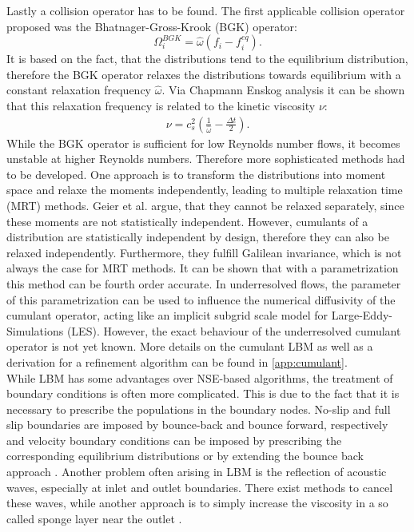 Lastly a collision operator has to be found. The first applicable collision operator proposed was the Bhatnager-Gross-Krook (BGK) operator:
\begin{equation}
	\Omega^{BGK}_i = \hat{\omega}\left(f_i - f_i^{eq} \right). \label{eq:BGK}
\end{equation}
It is based on the fact, that the distributions tend to the equilibrium distribution, therefore the BGK operator relaxes the distributions towards equilibrium with a constant relaxation frequency $\hat{\omega}$. Via Chapmann Enskog analysis it can be shown that this relaxation frequency is related to the kinetic viscosity $\nu$: \cite[p. 98-100, 112]{kruger_lattice_2017}
\begin{align}
	\nu = c_s^2\left(\frac{1}{\hat{\omega}} - \frac{\Delta t }{2} \right). \label{eq:nu}
\end{align}
While the BGK operator is sufficient for low Reynolds number flows, it becomes unstable at higher Reynolds numbers. Therefore more sophisticated methods had to be developed. One approach is to transform the distributions into moment space and relaxe the moments independently, leading to multiple relaxation time (MRT) methods. Geier et al. argue, that they cannot be relaxed separately, since these moments are not statistically independent. However, cumulants of a distribution are statistically independent by design, therefore they can also be relaxed independently. Furthermore, they fulfill Galilean invariance, which is not always the case for MRT methods. It can be shown that with a parametrization this method can be fourth order accurate\cite{geier_fourth_2018}. In underresolved flows, the parameter of this parametrization can be used to influence the numerical diffusivity of the cumulant operator, acting like an implicit subgrid scale model for Large-Eddy-Simulations (LES)\cite{asmuth_actuator_2020}. However, the exact behaviour of the underresolved cumulant operator is not yet known. More details on the cumulant LBM as well as a derivation for a refinement algorithm can be found in \autoref{app:cumulant}. \\
While LBM has some advantages over NSE-based algorithms, the treatment of boundary conditions is often more complicated. This is due to the fact that it is necessary to prescribe the populations in the boundary nodes. No-slip and full slip boundaries are imposed by bounce-back and bounce forward, respectively and velocity boundary conditions can be imposed by prescribing the corresponding equilibrium distributions or by extending the bounce back approach \cite[p. 175 - 189, 199 - 207]{kruger_lattice_2017}. Another problem often arising in LBM is the reflection of acoustic waves, especially at inlet and outlet boundaries. There exist methods to cancel these waves, while another approach is to simply increase the viscosity in a so called sponge layer near the outlet \cite[p. 522 - 526]{kruger_lattice_2017}.
